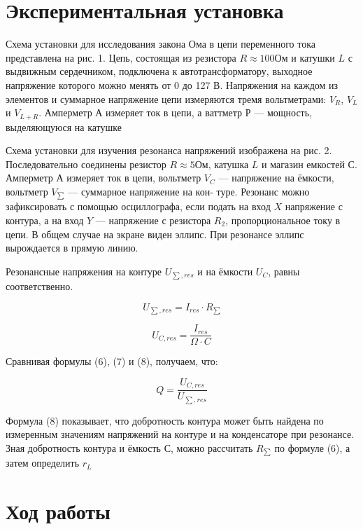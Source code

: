\documentclass[a4paper,12pt]{article}
\begin{document}
\section{Экспериментальная установка}
Схема установки для исследования
закона Ома в цепи переменного тока представлена на рис. 1. Цепь, состоящая из резистора $R \approx 100 Ом$ и катушки $L$ с выдвижным сердечником, подключена к автотрансформатору, выходное напряжение которого можно менять от 0 до 127 В. Напряжения на каждом из элементов
и суммарное напряжение цепи измеряются тремя вольтметрами: $V_R$, $V_L$ и $V_{L+R}$. Амперметр $А$ измеряет ток в цепи, а ваттметр $Р$ — мощность,
выделяющуюся на катушке

Схема установки для изучения резонанса напряжений изображена
на рис. 2. Последовательно соединены резистор $R \approx 5 Ом$, катушка $L$ и
магазин емкостей $С$. Амперметр $А$ измеряет ток в цепи, вольтметр $V_C$ —
напряжение на ёмкости, вольтметр $V_{\sum}$ — суммарное напряжение на кон-
туре. Резонанс можно зафиксировать с помощью осциллографа, если
подать на вход $X$ напряжение с контура, а на вход $Y$ — напряжение с
резистора $R_2$, пропорциональное току в цепи. В общем случае на экране
виден эллипс. При резонансе эллипс вырождается в прямую линию.

Резонансные напряжения на контуре $U_{\sum, res}$  и на ёмкости $U_C$,
равны соответственно.

\begin{equation}\label{}
U_{\sum, res} = I_{res}\cdot R_{\sum}
\end{equation}

\begin{equation}\label{}
U_{C,res} = \frac{I_{res}}{\Omega \cdot C}
\end{equation}

Сравнивая формулы (6), (7) и (8), получаем, что:


\begin{equation}\label{}
Q = \frac{U_{C, res}}{U_{\sum, res}}
\end{equation}

Формула (8) показывает, что добротность контура может быть найдена по измеренным значениям напряжений на контуре и на конденсаторе при резонансе. Зная добротность контура и ёмкость С, можно рассчитать $R_{\sum}$ по формуле (6), а затем определить $r_L$


\section{Ход работы}
\end{document}
